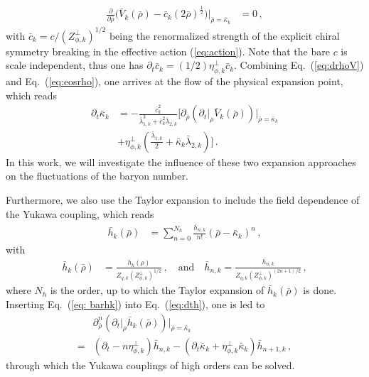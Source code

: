 \documentclass[%
reprint,
superscriptaddress,
showpacs,preprintnumbers,
 amsmath,amssymb,
 aps,
prd,
]{revtex4-1}
\def\Eq#1{Eq.~(\ref{#1})}
\def\eq#1{(\ref{#1})}
\begin{document}
\begin{align}
  \frac{\partial}{\partial \bar \rho}\Big(\bar V_k(\bar \rho)-\bar c_k (2\bar \rho)^{\frac{1}{2}}\Big)\bigg|_{\bar \rho=\bar \kappa_k}&=0\,,\label{eq:eosrho}
\end{align}
with $\bar c_k=c/(Z^{\perp}_{\phi,k})^{1/2}$ being the renormalized strength of the explicit chiral symmetry breaking in the effective action \eq{eq:action}. Note that the bare $c$ is scale independent, thus one has $\partial_t \bar c_k=(1/2)\eta_{\phi,k}^{\perp}\bar c_k$. Combining \Eq{eq:drhoV} and \Eq{eq:eosrho}, 
one arrives at the flow of the physical expansion point, which reads
\begin{align}
  \partial_t \bar \kappa_k&=-\frac{\bar c_k^2}{\bar{\lambda}_{1,k}^3+\bar c_k^2\bar{\lambda}_{2,k}}\bigg[\partial_{\bar \rho}\left(\partial_t\big|_{\rho} \bar V_k(\bar \rho)\right)\Big|_{\bar \rho=\bar \kappa_k}\nonumber \\[2ex]
          &+\eta_{\phi,k}^{\perp}\left(\frac{\bar{\lambda}_{1,k}}{2}+\bar\kappa_k\bar{\lambda}_{2,k}\right)\bigg]\,.\label{}
\end{align}
In this work, we will investigate the influence of these two expansion approaches on the fluctuations of the baryon number. 

Furthermore, we also use the Taylor expansion to include the field dependence of the Yukawa coupling, which reads
\begin{align}
  \bar h_k(\bar \rho)&=\sum^{N_h}_{n=0}\frac{\bar h_{n,k}}{n!}(\bar \rho -\bar \kappa_k)^n\,,\label{}
\end{align}
with 
\begin{align}
  \bar h_k(\bar \rho)&=\frac{h_k(\rho)}{Z_{q,k}(Z^{\perp}_{\phi,k})^{1/2}}\,,\quad \text{and}\quad \bar h_{n,k}=\frac{h_{n,k}}{Z_{q,k}(Z^{\perp}_{\phi,k})^{(2n+1)/2}}\,,\label{eq: barhk}
\end{align}
where $N_h$ is the order, up to which the Taylor expansion of $\bar h_k(\bar \rho)$ is done. Inserting \Eq{eq: barhk} into \Eq{eq:dth}, one is led to
\begin{align}
  &\partial^n_{\bar \rho}\left(\partial_t\big|_{\rho} \bar h_k(\bar \rho)\right)\Big|_{\bar \rho=\bar \kappa_k}\nonumber\\[2ex]
=&(\partial_t -n\eta_{\phi,k}^{\perp})\bar h_{n,k}-(\partial_t \bar \kappa_k+\eta_{\phi,k}^{\perp}\bar \kappa_k)\bar h_{n+1,k}\,,\label{}
\end{align}
through which the Yukawa couplings of high orders can be solved.
\end{document}
